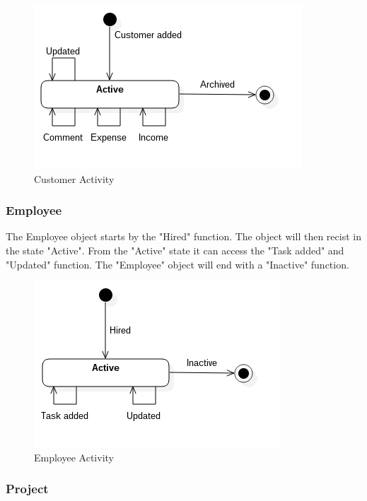 \begin{figure}[H]
    \centering
    \includegraphics[scale=0.6]{Images/ProblemDomain/customerActivityDiagram.png}
    \caption{Customer Activity}
    \label{fig:customerActivityDiagram}
\end{figure}

\subsubsection*{Employee}

The Employee object starts by the "Hired" function. The object will then recist in the state "Active". From the "Active" state it can access the "Task added" and "Updated" function. The "Employee" object will end with a "Inactive" function. %

\begin{figure}[H]
    \centering
    \includegraphics[scale=0.6]{Images/ProblemDomain/employeeActivityDiagram.png}
    \caption{Employee Activity}
    \label{fig:employeeActivityDiagram}
\end{figure}

\subsubsection*{Project}

